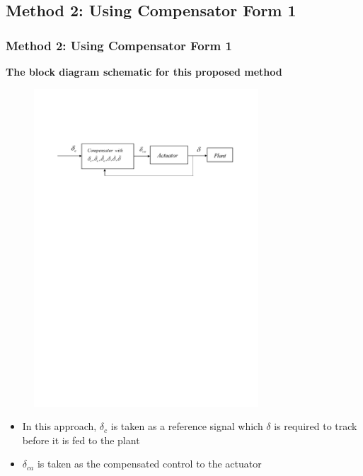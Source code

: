 \documentclass[table,10pt,red]{beamer}	%
\begin{document}
\subsection{Method 2: Using Compensator Form 1}
\begin{frame}
\frametitle{Method 2: Using Compensator Form 1}
\textbf{The block diagram schematic for this proposed method}
\begin{figure}[h]
\begin{center}
\includegraphics[width=8.4cm]{fig7}    %
\end{center}
\end{figure}

\begin{itemize}
\item In this approach, $\delta_c$ is taken as a reference signal which $\delta$ is required to track before it is fed to the plant
\item $\delta_{ca}$ is taken as the compensated control to the actuator
\end{itemize}

\end{frame}
\end{document}
